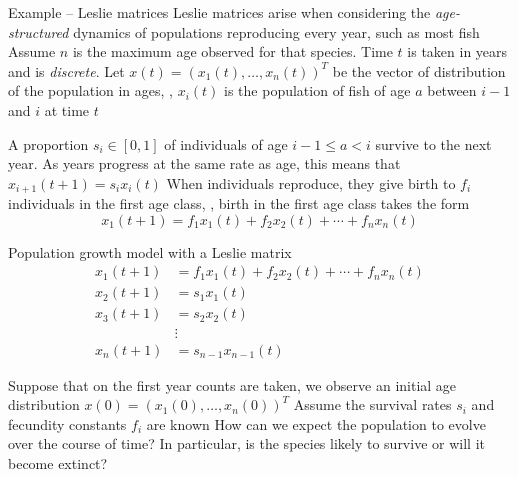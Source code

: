 \documentclass[aspectratio=169]{beamer}
\begin{document}
\begin{frame}{Example -- Leslie matrices}
Leslie matrices arise when considering the \emph{age-structured} dynamics of populations reproducing every year, such as most fish
\vfill
Assume $n$ is the maximum age observed for that species. Time $t$ is taken in years and is \emph{discrete}.
Let $x(t)=(x_1(t),\ldots,x_n(t))^T$ be the vector of distribution of the population in ages, \ie, $x_i(t)$ is the population of fish of age $a$ between $i-1$ and $i$ at time $t$
\vfill


A proportion $s_i\in[0,1]$ of individuals of age $i-1\leq a<i$ survive to the next year. As years progress at the same rate as age, this means that $x_{i+1}(t+1) = s_i x_i(t)$
\vfill
When individuals reproduce, they give birth to $f_i$ individuals in the first age class, \ie, birth in the first age class takes the form
\[
x_1(t+1)=f_1x_1(t)+f_2x_2(t)+\cdots+f_nx_n(t)
\]
\end{frame}

\begin{frame}{Population growth model with a Leslie matrix}
\begin{align*}
 x_1(t+1) &= f_1x_1(t)+f_2x_2(t)+\cdots+f_nx_n(t) \\
 x_2(t+1) &= s_1x_1(t) \\
 x_3(t+1) &= s_2x_2(t) \\
 &\vdots \\
 x_n(t+1) &= s_{n-1}x_{n-1}(t)
\end{align*}
\end{frame}

\begin{frame}
Suppose that on the first year counts are taken, we observe an initial age distribution $x(0)=(x_1(0),\ldots,x_n(0))^T$
\vfill
Assume the survival rates $s_i$ and fecundity constants $f_i$ are known
\vfill
How can we expect the population to evolve over the course of time? In particular, is the species likely to survive or will it become extinct?
\end{frame}
\end{document}
